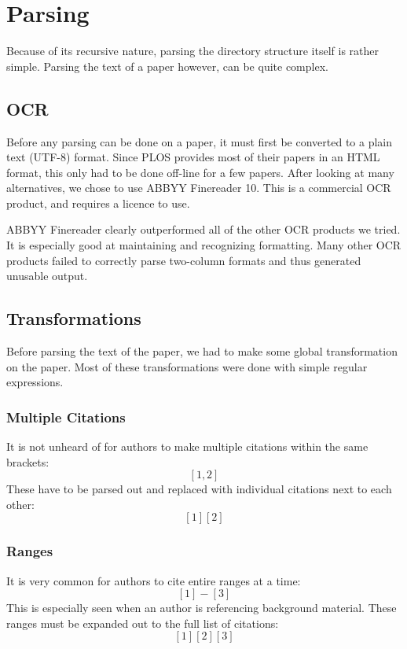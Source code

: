 \documentclass[10pt, conference, compsocconf]{IEEEtran}
\begin{document}
\section{Parsing}\label{sec:parsing}
Because of its recursive nature, parsing the directory structure itself is rather simple.
Parsing the text of a paper however, can be quite complex.

\subsection{OCR}
Before any parsing can be done on a paper, it must first be converted to a plain text (UTF-8) format.
Since PLOS provides most of their papers in an HTML format, this only had to be done off-line for a few
papers. After looking at many alternatives, we chose to use ABBYY Finereader 10\cite{abbyy}. This
is a commercial OCR product, and requires a licence to use.

ABBYY Finereader clearly outperformed all of the other OCR products we tried. It is especially
good at maintaining and recognizing formatting. Many other OCR products failed to correctly parse
two-column formats and thus generated unusable output.

\subsection{Transformations}\label{sec:transforms}
Before parsing the text of the paper, we had to make some global transformation on the paper.
Most of these transformations were done with simple regular expressions.

\subsubsection{Multiple Citations}
It is not unheard of for authors to make multiple citations within the same brackets: $$[1, 2]$$
These have to be parsed out and replaced with individual citations next to each other: $$[1][2]$$

\subsubsection{Ranges}
It is very common for authors to cite entire ranges at a time: $$[1] - [3]$$
This is especially seen when an author is referencing background material. These ranges must be expanded out to
the full list of citations: $$[1][2][3]$$
\end{document}
